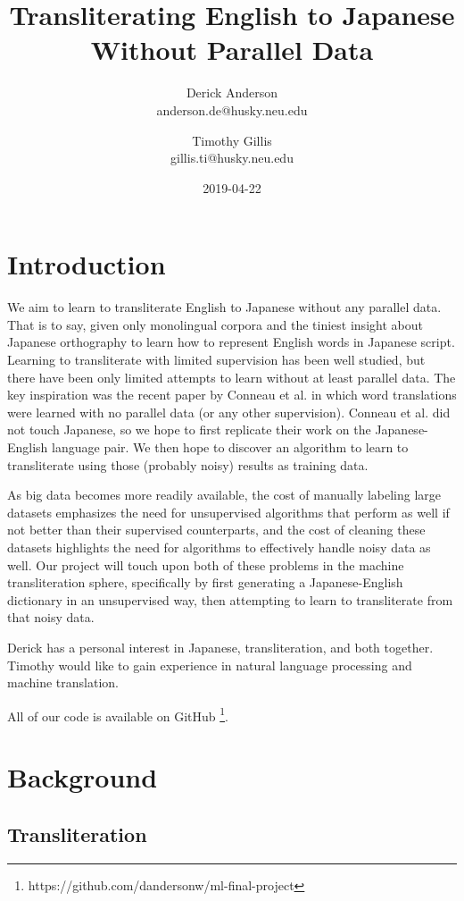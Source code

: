 \documentclass{article}
\title{Transliterating English to Japanese Without Parallel Data}
\date{2019-04-22}
\author{Derick Anderson \\ anderson.de@husky.neu.edu
  \and Timothy Gillis \\ gillis.ti@husky.neu.edu }
\begin{document}
\maketitle

\section*{Introduction}

We aim to learn to transliterate English to Japanese
without any parallel data.
That is to say,
given only monolingual corpora
and the tiniest insight about Japanese orthography
to learn how to represent English words in Japanese script.
Learning to transliterate with limited supervision has been well studied,
but there have been only limited attempts to learn without at least parallel data.
The key inspiration was the recent paper by
Conneau et al. \cite{Conneau2018WordTW}
in which word translations were learned with no parallel data
(or any other supervision).
Conneau et al. did not touch Japanese,
so we hope to first replicate their work on the Japanese-English language pair.
We then hope to discover an algorithm to learn to transliterate
using those (probably noisy) results as training data.

As big data becomes more readily available, the cost of manually labeling large
datasets emphasizes the need for unsupervised algorithms that perform as well if
not better than their supervised counterparts, and the cost of cleaning these
datasets highlights the need for algorithms to effectively handle noisy data as well.
Our project will touch upon both of these problems in the machine transliteration
sphere, specifically by first generating a Japanese-English dictionary in an
unsupervised way, then attempting to learn to transliterate from that noisy data.

Derick has a personal interest in Japanese, transliteration, and both together.
Timothy would like to gain experience in natural language processing and machine
translation.

\noindent
All of our code is available on GitHub
\footnote{https://github.com/dandersonw/ml-final-project}.

\section*{Background}

\subsection*{Transliteration}
\end{document}
